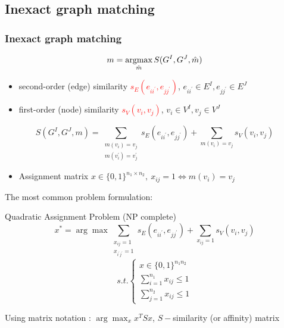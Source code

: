 \documentclass[hyperref={pdfpagelabels=false}]{beamer}
\def\argmax{\mathop{\rm argmax}}						%
\begin{document}
\subsection{Inexact graph matching}
\begin{frame} [allowframebreaks]
\frametitle{Inexact graph matching}
\begin{equation*}
m = \argmax_{\hat{m}}S(G^I, G^J, \hat{m})
\end{equation*}
\begin{itemize}
\item second-order (edge) similarity \textcolor{red}{$s_E(e_{ii^\prime},e_{jj^\prime})$}, $e_{ii^\prime}\in E^I, e_{jj^\prime}\in E^J$
\item first-order (node) similarity \textcolor{red}{$s_V(v_{i},v_{j})$}, $v_i\in V^I, v_j\in V^J$
\end{itemize}

\begin{equation*}
	S(G^I,G^J,m)=\sum_{\substack{m(v_i)=v_j\\m(v_i^{\prime})=v_j^{\prime}}}s_E(e_{ii^\prime},e_{jj^\prime}) + \sum_{m(v_i)=v_j}s_V(v_{i},v_{j})
\end{equation*}

\begin{itemize}
\item Assignment matrix $x\in\{0,1\}^{n_1\times n_2},\ x_{ij}=1\iff m(v_i)=v_j$
\end{itemize}

\framebreak
The most common problem formulation:
\begin{block}{Quadratic Assignment Problem (NP complete)~\cite{Burkard98thequadratic}}
$$x^* = \arg\max \sum_{\substack{x_{ij}=1\\x_{i^\prime j^\prime}=1}}s_E(e_{ii^\prime},e_{jj^\prime}) + \sum_{x_{ij}=1}s_V(v_{i},v_{j}) $$
$$ s.t. \begin{cases}
		x\in\{0,1\}^{n_1n_2} \\
		\sum_{i=1}^{n_1}x_{ij}\le 1 \\
		\sum_{j=1}^{n_2}x_{ij}\le 1
\end{cases}$$
\end{block}
Using matrix notation : $\arg\max_{x}{x^TSx}$, $S-$similarity (or affinity) matrix


\framebreak


\end{frame}
\end{document}
